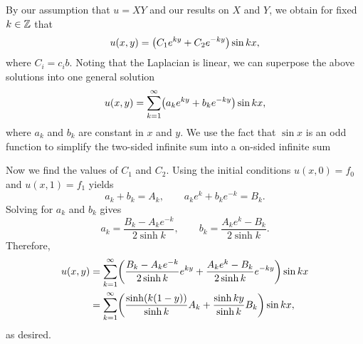 \begin{pb}[1]
\begin{soln}
    By our assumption that \(u = XY\) and our results on \(X\) and \(Y\),
    we obtain for fixed \(k \in \mathbb{Z}\) that
    \begin{equation*}
        u(x, y) = \lrb{C_1 e^{k y} + C_2 e^{-k y}} \sin k x,
    \end{equation*}
    where \(C_i = c_i b\).
    Noting that the Laplacian is linear, we can superpose the above solutions into one general solution
    \begin{equation*}
        u(x, y) = \sum_{k = 1}^{\infty} \lrb{a_k e^{k y} + b_k e^{-k y}} \sin kx,
    \end{equation*}
    where \(a_k\) and \(b_k\) are constant in \(x\) and \(y\).
    We use the fact that \(\sin x\) is an odd function to simplify the two-sided infinite
    sum into a on-sided infinite sum

    Now we find the values of \(C_1 \) and \(C_2\).
    Using the initial conditions \(u(x, 0) = f_0\) and \(u(x, 1) = f_1\) yields
    \begin{equation*}
        a_k + b_k = A_k, \quad \quad a_k e^{k} + b_k e^{-k} = B_k.
    \end{equation*}
    Solving for \(a_k\) and \(b_k\) gives
    \begin{equation*}
        a_k = \frac{B_k - A_k e^{-k}}{2 \sinh k}, \quad \quad
        b_k = \frac{A_k e^{k} - B_k}{2 \sinh k}.
    \end{equation*}
    Therefore,
    \begin{align*}
        u(x, y)
        &= \sum_{k = 1}^{\infty} \lrb{\frac{B_k - A_k e^{-k}}{2 \sinh k} e^{ky} + \frac{A_k e^{k} - B_k}{2 \sinh k} e^{-ky}} \sin kx \\
        &= \sum_{k = 1}^{\infty} \lrb{\frac{\sinh(k(1 - y))}{\sinh k} A_k + \frac{\sinh ky}{\sinh k}B_k} \sin kx,
    \end{align*}
    as desired.


\end{soln}
\end{pb}
